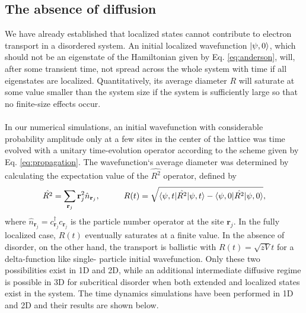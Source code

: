 \documentclass[10pt,a4paper]{article}
\begin{document}
\subsection{The absence of diffusion}
We have already established that localized states cannot contribute to electron transport in a disordered system. An initial localized wavefunction $\vert\psi, 0\rangle$, which should not be an eigenstate of the Hamiltonian given by Eq. \eqref{eq:anderson}, will, after some transient time, not spread across the whole system with time if all eigenstates are localized. Quantitatively, its average diameter $R$ will saturate at some value smaller than the system size if the system is sufficiently large so that no finite-size effects occur.\\\\
\noindent 
In our numerical simulations, an initial wavefunction with considerable probability amplitude only at a few sites in the center of the lattice was time evolved with a unitary time-evolution operator according to the scheme given by Eq. \eqref{eq:propagation}. The wavefunction`s average diameter was determined by calculating the expectation value of the $\hat{R^2}$ operator, defined by
\begin{equation}\label{eq:spread}
\hat{R^2}=\sum\limits_{\mathbf{r}_j} \mathbf{r}_j^2 \hat{n}_{\mathbf{r}_j}, \hspace{10mm} R(t)=\sqrt{\bra{\psi,t} \hat{R^2}\ket{\psi,t}-\bra{\psi,0} \hat{R^2}\ket{\psi,0}},
\end{equation}
where $\hat{n}_{\mathbf{r}_j}=c^\dagger_{\mathbf{r}_j}c_{\mathbf{r}_j}$ is the particle number operator at the site $\mathbf{r}_j$. In the fully localized case, $R(t)$ eventually saturates at a finite value. In the absence of disorder, on the other hand, the transport is ballistic with $R(t)=\sqrt{zV}t$ for a delta-function like single- particle initial wavefunction. Only these two possibilities exist in 1D and 2D, while an additional intermediate diffusive regime is possible in 3D for subcritical disorder when both extended and localized states exist in the system. The time dynamics simulations have been performed in 1D and 2D and their results are shown below.   \\\\
\noindent 
\end{document}
